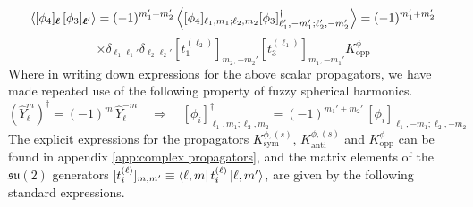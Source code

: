 %
%
\begin{equation*}
\expval{
[\phi_4]_{\boldsymbol{\ell}} \,
[\phi_3]_{\boldsymbol{\ell}'}
}
=
(-1)^{m_1' + m_2'} \expval{
[\phi_4]_{\ell_1,m_1;\ell_2,m_2}
[\phi_3]^\dagger_{\ell_1',-m_1';\ell_2',-m_2'}
}
=
(-1)^{m_1' + m_2'}
\end{equation*}
%
%
\begin{equation}
\times
\delta_{\ell_1 \ell_1'} \delta_{\ell_2 \ell_2'}
[t_1^{(\ell_2)}]_{m_2, -m_2'}
[t_3^{(\ell_1)}]_{m_1, -m_1'}
K^{\phi}_{\text{opp}}
\end{equation}
%
%
Where in writing down expressions for the above scalar propagators, we have made repeated use of the following property of fuzzy spherical harmonics.
%
%
\begin{equation}
(\hat{Y}^m_\ell)^\dagger
=
(-1)^m \, \hat{Y}^{-m}_\ell
%
\quad \Rightarrow \quad
%
[\phi_i]^\dagger_{\ell_1,m_1;\ell_2,m_2}
=
(-1)^{m_1' + m_2'} \,
[\phi_i]_{\ell_1,-m_1;\ell_2,-m_2}
\end{equation}
%
%
The explicit expressions for the propagators $K^{\phi,(s)}_{\text{sym}}$, $K^{\phi,(s)}_{\text{anti}}$ and $K^{\phi}_{\text{opp}}$ can be found in appendix \ref{app:complex propagators}, and the matrix elements of the $\mathfrak{su}(2)$ generators $[t^{(\ell)}_i]_{m,m'} \equiv \bra{\ell, m} t^{(\ell)}_i \ket{\ell, m'}$, are given by the following standard expressions.

